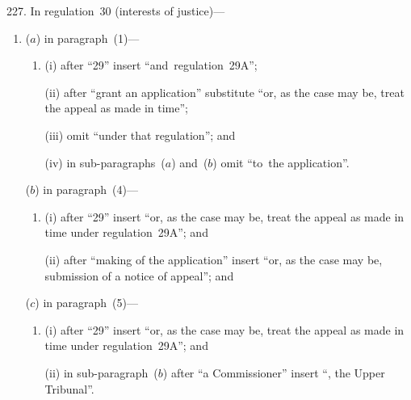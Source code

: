 \documentclass[12pt,a4paper]{article}
\begin{document}
227.  In regulation~30 (interests of justice)—
\begin{enumerate}\item[]
($a$) in paragraph~(1)—
\begin{enumerate}\item[]
(i) after “29” insert “and~regulation~29A”;

(ii) after “grant an application” substitute “or, as the case may be, treat the appeal as made in time”;

(iii) omit “under that regulation”; and

(iv) in sub-paragraphs~($a$)  and~($b$)  omit “to~the application”.
\end{enumerate}

($b$) in paragraph~(4)—
\begin{enumerate}\item[]
(i) after “29” insert “or, as the case may be, treat the appeal as made in time under regulation~29A”; and

(ii) after “making of the application” insert “or, as the case may be, submission of a notice of appeal”; and
\end{enumerate}

($c$) in paragraph~(5)—
\begin{enumerate}\item[]
(i) after “29” insert “or, as the case may be, treat the appeal as made in time under regulation~29A”; and

(ii) in sub-paragraph~($b$)  after “a Commissioner” insert “, the Upper Tribunal”.
\end{enumerate}
\end{enumerate}

\medskip
\end{document}
